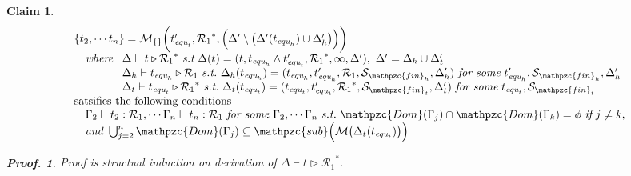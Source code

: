 \documentclass[12pt]{article}
\newtheorem{Claim}{Claim}[section]
\newtheorem{Proof}{Proof.}
\begin{document}
\begin{Claim}
  \label{claim1_for_completeness}
  \[ \begin{array}{l}
      \{t_2, \cdots t_n\} = \mathcal{M}_{\{\}}\biggl(t'_{\text{\it equ}_t},
       {\mathcal{R}_1}^*, \Bigl(\Delta' \setminus \bigl(\Delta'(
        t_{\text{\it equ}_h}) \cup \Delta'_h \bigr) \Bigr) \biggr)  \\
         \quad \text{\it where}\ \begin{array}[t]{l}
           \Delta \vdash t \triangleright {\mathcal{R}_1}^*\ \text{\it s.t}\
            \Delta(t) = (t, t_{\text{\it equ}_h} \wedge
             t'_{\text{\it equ}_t}, {\mathcal{R}_1}^*, \infty, \Delta' ),\
              \Delta' = \Delta_h \cup \Delta'_t  \\
           \Delta_h \vdash t_{\text{\it equ}_h} \triangleright
            \mathcal{R}_1\ \text{\it s.t.}\ 
             \Delta_h(t_{\text{\it equ}_h}) = (t_{\text{\it equ}_h},
              t'_{\text{\it equ}_h}, \mathcal{R}_1,
               \mathcal{S}_{\mathpzc{fin}_h}, \Delta'_h )\
                \text{\it for some}\ t'_{\text{\it equ}_h},
                 \mathcal{S}_{\mathpzc{fin}_h}, \Delta'_h  \\ 
           \Delta_t \vdash t_{\text{\it equ}_t} \triangleright
            {\mathcal{R}_1}^*\ \text{\it s.t.}\
             \Delta_t(t_{\text{\it equ}_t}) =(t_{\text{\it equ}_t},
              t'_{\text{\it equ}_t}, {\mathcal{R}_1}^*,
               \mathcal{S}_{\mathpzc{fin}_t}, \Delta'_t)\
                \text{\it for some}\ t_{\text{\it equ}_t},
                 \mathcal{S}_{\mathpzc{fin}_t}
         \end{array}  \\
      \mbox{satsifies the following conditions}\\
       \quad \Gamma_2 \vdash t_2: \mathcal{R}_1, \cdots
        \Gamma_n \vdash t_n: \mathcal{R}_1\ \text{\it for some}\
         \Gamma_2, \cdots \Gamma_n\ \text{\it s.t.}\
          \mathpzc{Dom}(\Gamma_j) \cap \mathpzc{Dom}(\Gamma_k) = \phi\
           \text{\it if}\ j \neq k,  \\
       \quad \text{\it and}\ \bigcup_{j=2}^n\mathpzc{Dom}(\Gamma_j)
        \subseteq \mathpzc{sub}\Bigl(\mathcal{M}\bigl(\Delta_t(t_{
         \text{\it equ}_t}) \bigr) \Bigr)
     \end{array}
  \]
  \begin{Proof}
    Proof is structual induction on derivation of
    $\Delta \vdash t \triangleright {\mathcal{R}_1}^*$.
    

\end{Proof}
\end{Claim}
\end{document}
